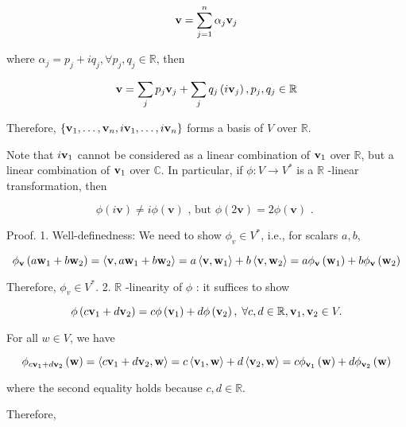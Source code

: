 \documentclass[11pt]{article}
\begin{document}
\[
\mathbf{v} = \mathop{\sum }\limits_{{j = 1}}^n\alpha_{j}{\bf v}_{j}
\]

where \(\alpha_{j} = {p}_{j} + i{q}_{j},\forall {p}_{j},{q}_{j} \in  \mathbb{R}\), then

\[
\mathbf{v} = \mathop{\sum }\limits_{j}{p}_{j}{\bf v}_{j} + \mathop{\sum }\limits_{j}{q}_{j}\left( {i{\bf v}_{j}}\right) ,{p}_{j},{q}_{j} \in  \mathbb{R}
\]

Therefore, \(\left\{  {{\bf v}_1,\ldots ,{\bf v}_n,i{\bf v}_1,\ldots ,i{\bf v}_n}\right\}\) forms a basis of \(V\) over \(\mathbb{R}\).

Note that \(i{\bf v}_1\) cannot be considered as a linear combination of \({\bf v}_1\) over \(\mathbb{R}\), but a linear combination of \({\bf v}_1\) over \(\mathbb{C}\). In particular, if \(\phi  : V \rightarrow  {V}^{ * }\) is a \(\mathbb{R}\) -linear transformation, then

\[
\phi \left( {i\mathbf{v}}\right)  \neq  {i\phi }\left( \mathbf{v}\right) \text{ , but }\phi \left( {2\mathbf{v}}\right)  = {2\phi }\left( \mathbf{v}\right) \text{ . }
\]

Proof. 1. Well-definedness: We need to show \({\phi }_{v} \in  {V}^{ * }\), i.e., for scalars \(a,b\),

\[
{\phi }_{\bf v}\left( {a{\bf w}_1 + b{\bf w}_2}\right)  = \left\langle  {\mathbf{v},a{\bf w}_1 + b{\bf w}_2}\right\rangle   = a\left\langle  {\mathbf{v},{\bf w}_1}\right\rangle   + b\left\langle  {\mathbf{v},{\bf w}_2}\right\rangle   = a{\phi }_{\bf v}\left( {\bf w}_1\right)  + b{\phi }_{\bf v}\left( {\bf w}_2\right)
\]

Therefore, \({\phi }_{v} \in  {V}^{ * }\). 2. \(\mathbb{R}\) -linearity of \(\phi\) : it suffices to show

\[
\phi \left( {c{\bf v}_1 + d{\bf v}_2}\right)  = {c\phi }\left( {\bf v}_1\right)  + {d\phi }\left( {\bf v}_2\right) ,\;\forall c,d \in  \mathbb{R},{\bf v}_1,{\bf v}_2 \in  V.
\]

For all \(w \in  V\), we have

\[
{\phi }_{c{\bf v}_1 + d{\bf v}_2}\left( \mathbf{w}\right)  = \left\langle  {c{\bf v}_1 + d{\bf v}_2,\mathbf{w}}\right\rangle   = c\left\langle  {{\bf v}_1,\mathbf{w}}\right\rangle   + d\left\langle  {{\bf v}_2,\mathbf{w}}\right\rangle   = c{\phi }_{{\bf v}_1}\left( \mathbf{w}\right)  + d{\phi }_{{\bf v}_2}\left( \mathbf{w}\right)
\]

where the second equality holds because \(c,d \in  \mathbb{R}\).

Therefore,
\end{document}
